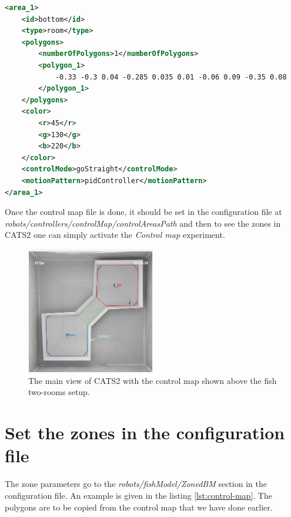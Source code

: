 \documentclass{styles/assisi}
\begin{document}
\begin{lstlisting}[caption={Control map area example},label={lst:control-map},language=xml]
<area_1>
    <id>bottom</id>
    <type>room</type>
    <polygons>
        <numberOfPolygons>1</numberOfPolygons>
        <polygon_1>
            -0.33 -0.3 0.04 -0.285 0.035 0.01 -0.06 0.09 -0.35 0.08
        </polygon_1>
    </polygons>
    <color>
        <r>45</r>
        <g>130</g>
        <b>220</b>
    </color>
    <controlMode>goStraight</controlMode>
    <motionPattern>pidController</motionPattern>
</area_1>
\end{lstlisting}

Once the control map file is done, it should be set in the configuration file at {\it robots/controllers/controlMap/controlAreasPath} and then to see the zones in CATS2 one can simply activate the {\it Control map} experiment. 

\begin{figure}[ht]
\centering
\includegraphics[width=0.5\textwidth]{./figs/control-map.png}
\caption{The main view of CATS2 with the control map shown above the fish two-rooms setup.}
\label{fig:control-map}
\end{figure}

\section{Set the zones in the configuration file}
The zone parameters go to the {\it robots/fishModel/ZonedBM} section in the configuration file. An example is given in the listing \ref{lst:control-map}.
The polygons are to be copied from the control map that we have done earlier.
\end{document}
